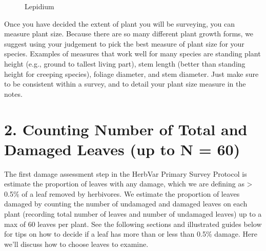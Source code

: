 \documentclass[
  letterpaper,
  oneside,
  open=any]{scrbook}
\begin{document}
\begin{figure}


\caption{\label{fig-lepidium}Lepidium}

\end{figure}%

Once you have decided the extent of plant you will be surveying, you can
measure plant size. Because there are so many different plant growth
forms, we suggest using your judgement to pick the best measure of plant
size for your species. Examples of measures that work well for many
species are standing plant height (e.g., ground to tallest living part),
stem length (better than standing height for creeping species), foliage
diameter, and stem diameter. Just make sure to be consistent within a
survey, and to detail your plant size measure in the notes.

\section{2. Counting Number of Total and Damaged Leaves (up to N =
60)}\label{counting-number-of-total-and-damaged-leaves-up-to-n-60}

The first damage assessment step in the HerbVar Primary Survey Protocol
is estimate the proportion of leaves with any damage, which we are
defining as \textgreater{} 0.5\% of a leaf removed by herbivores. We
estimate the proportion of leaves damaged by counting the number of
undamaged and damaged leaves on each plant (recording total number of
leaves and number of undamaged leaves) up to a max of 60 leaves per
plant. See the following sections and illustrated guides below for tips
on how to decide if a leaf has more than or less than 0.5\% damage. Here
we'll discuss how to choose leaves to examine.
\end{document}
